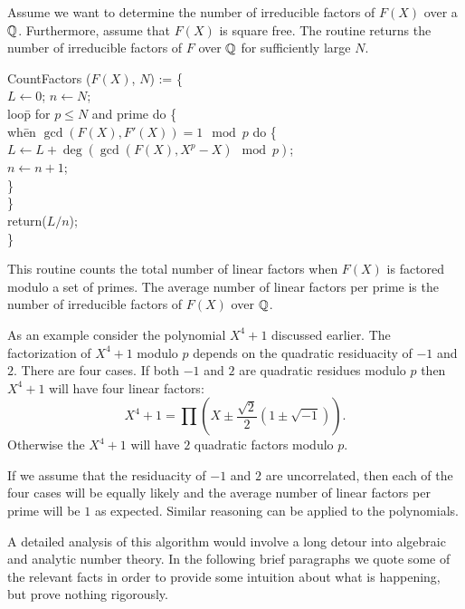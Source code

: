 Assume we want to determine the number of irreducible factors of
$F(X)$ over a $\mathbb{Q}$.  Furthermore, assume that $F(X)$ is square free.
The routine  returns the number of irreducible
factors of $F$ over $\mathbb{Q}$ for sufficiently large $N$.

\begindsacode
CountFactors ($F(X)$, $N$) := \{ \\
\> $L \leftarrow 0$; $n \leftarrow N$; \\
\> loo\=p  for $p \le N$ and prime do \{ \\
\>\> wh\=en $\gcd(F(X), F'(X)) = 1 \mod{p}$ do \{ \\
\>\>\> $L \leftarrow L + \deg(\gcd(F(X), X^p - X) \mod{p})$; \\
\>\>\> $n \leftarrow n + 1$; \\
\>\>\> \} \\
\>\> \} \\
\> return($L/n$); \\
\> \}
\enddsacode

This routine counts the total number of linear factors when $F(X)$ is
factored modulo a set of primes.  The average number of linear factors
per prime is the number of irreducible factors of $F(X)$ over $\mathbb{Q}$.

As an example consider the polynomial $X^4 + 1$ discussed earlier.
The factorization of $X^4 + 1 $ modulo $p$ depends on the quadratic
residuacity of $-1$ and $2$.  There are four cases.  If both $-1$ and
$2$ are quadratic residues modulo $p$ then $X^4+1$ will have four
linear factors:
\[
X^4 +1 = \prod \left(X \pm \frac{\sqrt{2}}{2}(1 \pm \sqrt{-1})\right).
\]
Otherwise the $X^4+1$ will have $2$ quadratic factors modulo $p$.

If we assume that the residuacity of $-1$ and $2$ are uncorrelated,
then each of the four cases will be equally likely and the average
number of linear factors per prime will be $1$ as expected.  Similar
reasoning can be applied to the {\SwinnertonDyer}
polynomials.  

\medskip
A detailed analysis of this algorithm would involve a long detour into
algebraic and analytic number theory.  In the following brief
paragraphs we quote some of the relevant facts in order to provide
some intuition about what is happening, but prove nothing
rigorously.  

